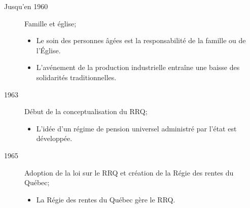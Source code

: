 \documentclass[10pt, french]{article}
\begin{document}
\begin{multicols*}{3}
\begin{rappel_enhanced}
\begin{description}
\item[Jusqu'en 1960] Famille et église;
		\begin{itemize}[leftmargin = *]
		\item	Le soin des personnes âgées est la responsabilité de la famille ou de l'Église.
		\item	L'avénement de la production industrielle entraîne une baisse des solidarités traditionnelles.
		\end{itemize}
	\item[1963]	Début de la conceptualisation du RRQ;
		\begin{itemize}[leftmargin = *]
		\item	L'idée d'un régime de pension universel administré par l'état est développée.
		\end{itemize}
	\item[1965]	Adoption de la loi sur le RRQ et création de la Régie des rentes du Québec;
		\begin{itemize}[leftmargin = *]
		\item	La Régie des rentes du Québec gère le RRQ.
		\end{itemize}
		

\end{description}
\end{rappel_enhanced}
\end{multicols*}
\end{document}
